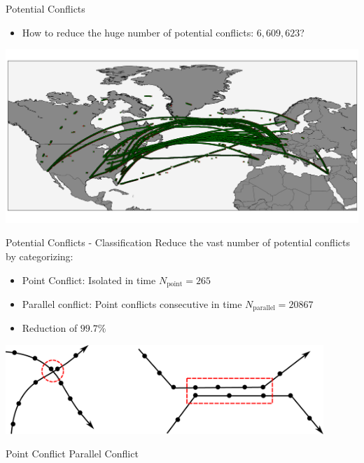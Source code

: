 \documentclass[10pt]{beamer}
\begin{document}
\begin{frame}[t]{Potential Conflicts}
    \begin{itemize}
        \item How to reduce the huge number of potential conflicts: $6,609,623$?
    \end{itemize}
    \vspace{-0.2cm}
    \includegraphics[width=1.0\textwidth]{images/spatial_conflicts_data.png}
\end{frame}
\begin{frame}[t]{Potential Conflicts - Classification}
    Reduce the vast number of potential conflicts by categorizing:
    \begin{itemize}
        \item Point Conflict: Isolated in time $N_\text{point} = 265$
        \item Parallel conflict: Point conflicts consecutive in time $N_\text{parallel} = 20867$
        \item Reduction of $99.7 \%$
    \end{itemize}
    \begin{center}
        \includegraphics[width=0.9\textwidth]{images/spatial_conflict_categories.pdf}
    \end{center}
    \hspace{1.0cm}
    Point Conflict
    \hspace{3.5cm}
    Parallel Conflict
\end{frame}
\end{document}
